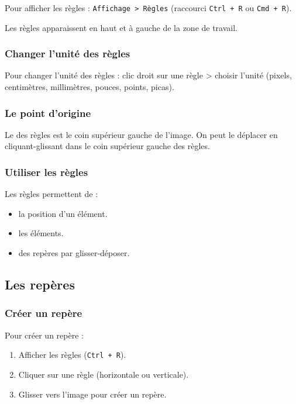 Pour afficher les règles : \texttt{Affichage > Règles} (raccourci \texttt{Ctrl + R} ou \texttt{Cmd + R}).

Les règles apparaissent en haut et à gauche de la zone de travail.

\subsubsection{Changer l'unité des règles}

Pour changer l'unité des règles : clic droit sur une règle > choisir l'unité (pixels, centimètres, millimètres, pouces, points, picas).

\subsubsection{Le point d'origine}

Le  des règles est le coin supérieur gauche de l'image. On peut le déplacer en cliquant-glissant dans le coin supérieur gauche des règles.

\subsubsection{Utiliser les règles}

Les règles permettent de :

\begin{itemize}
    \item {} la position d'un élément.
    \item {} les éléments.
    \item {} des repères par glisser-déposer.
\end{itemize}

\subsection{Les repères}

\subsubsection{Créer un repère}

Pour créer un repère :

\begin{enumerate}
    \item Afficher les règles (\texttt{Ctrl + R}).
    \item Cliquer sur une règle (horizontale ou verticale).
    \item Glisser vers l'image pour créer un repère.
\end{enumerate}

